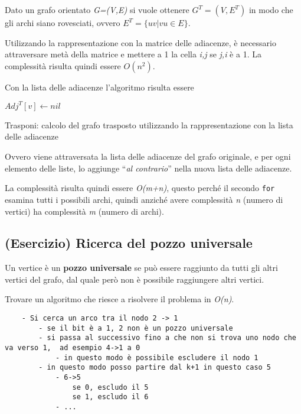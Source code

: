 Dato un grafo orientato \emph{G=(V,E)} si vuole ottenere $ G^T = (V, E^T)$ in modo che gli archi siano rovesciati, ovvero $E^T = \{uv | vu \in E\}$.

Utilizzando la rappresentazione con la matrice delle adiacenze, è
necessario attraversare metà della matrice e mettere a 1 la cella
\emph{i,j} se \emph{j,i} è a 1. La complessità risulta quindi essere
$O(n^2)$.

Con la lista delle adiacenze l'algoritmo risulta essere


\begin{algorithm}
	\begin{algorithmic}[1]
				\State $Adj^T[v] \gets nil$
			\EndFor
				\EndWhile
			\EndFor
		\EndFunction
	\end{algorithmic}
	\caption{Trasponi: calcolo del grafo trasposto utilizzando la rappresentazione con la lista delle adiacenze}
\end{algorithm}

Ovvero viene attraversata la lista delle adiacenze del grafo originale,
e per ogni elemento delle liste, lo aggiunge ``\emph{al contrario}''
nella nuova lista delle adiacenze.

La complessità risulta quindi essere \emph{O(m+n)}, questo perché il
secondo \texttt{for} esamina tutti i possibili archi, quindi anziché
avere complessità \emph{n} (numero di vertici) ha complessità \emph{m}
(numero di archi).

\subsection{(Esercizio) Ricerca del pozzo
universale}\label{esericizio-ricerca-del-pozzo-universale}

Un vertice è un \textbf{pozzo universale} se può essere raggiunto da
tutti gli altri vertici del grafo, dal quale però non è possibile
raggiungere altri vertici.

Trovare un algoritmo che riesce a risolvere il problema in \emph{O(n)}.


\begin{verbatim}
	- Si cerca un arco tra il nodo 2 -> 1
		- se il bit è a 1, 2 non è un pozzo universale
		- si passa al successivo fino a che non si trova uno nodo che va verso 1,  ad esempio 4->1 a 0
			- in questo modo è possibile escludere il nodo 1
		- in questo modo posso partire dal k+1 in questo caso 5
			- 6->5
				se 0, escludo il 5
				se 1, escludo il 6
			- ...
\end{verbatim}